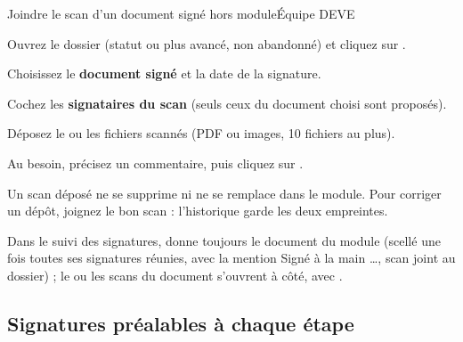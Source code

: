 \documentclass[11pt,a4paper]{article}
\begin{document}
\begin{procedure}{Joindre le scan d'un document signé hors module}{Équipe DEVE}
\begin{etapes}
  \item Ouvrez le dossier (statut  ou plus avancé,
        non abandonné) et cliquez sur .
  \item Choisissez le \textbf{document signé} et la date de la signature.
  \item Cochez les \textbf{signataires du scan} (seuls ceux du document
        choisi sont proposés).
  \item Déposez le ou les fichiers scannés (PDF ou images, 10 fichiers au plus).
  \item Au besoin, précisez un commentaire, puis cliquez sur
        .
\end{etapes}
\end{procedure}




\begin{attention}
Un scan déposé ne se supprime ni ne se remplace dans le module. Pour corriger un
dépôt, joignez le bon scan : l'historique garde les deux empreintes.
\end{attention}

Dans le suivi des signatures,  donne toujours le document du module
(scellé une fois toutes ses signatures réunies, avec la mention \og Signé à la
main \ldots{}, scan joint au dossier\fg{}) ; le ou les scans du document
s'ouvrent à côté, avec .

\subsection{Signatures préalables à chaque étape}\label{sec:prealables}
\end{document}
